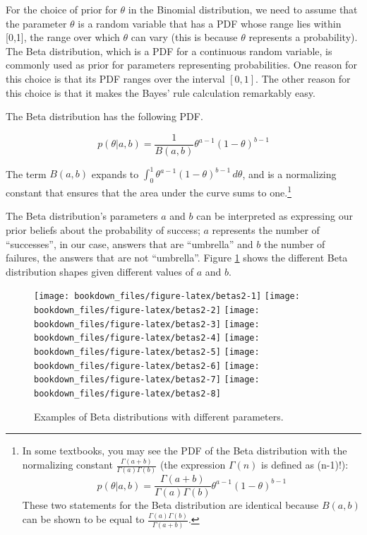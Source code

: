 \documentclass[12pt,]{krantz}
\theoremstyle{definition}
\theoremstyle{definition}
\theoremstyle{definition}
\theoremstyle{remark}
\begin{document}
For the choice of prior for \(\theta\) in the Binomial distribution, we need to assume that the parameter \(\theta\) is a random variable that has a PDF whose range lies within {[}0,1{]}, the range over which \(\theta\) can vary (this is because \(\theta\) represents a probability). The Beta distribution, which is a PDF for a continuous random variable, is commonly used as prior for parameters representing probabilities. One reason for this choice is that its PDF ranges over the interval \([0,1]\). The other reason for this choice is that it makes the Bayes' rule calculation remarkably easy.

The Beta distribution has the following PDF.

\begin{equation}
p(\theta|a,b)=  \frac{1}{B(a,b)} \theta^{a - 1} (1-\theta)^{b-1}   
\label{eq:beta}
\end{equation}

The term \(B(a,b)\) expands to \(\int_0^1 \theta^{a-1}(1-\theta)^{b-1}\, d\theta\), and is a normalizing constant that ensures that the area under the curve sums to one.\footnote{In some textbooks, you may see the PDF of the Beta distribution with the normalizing constant \(\frac{\Gamma(a+b)}{\Gamma(a)\Gamma(b)}\) (the expression \(\Gamma(n)\) is defined as (n-1)!): \[p(\theta|a,b)=  \frac{\Gamma(a+b)}{\Gamma(a)\Gamma(b)} \theta^{a - 1} (1-\theta)^{b-1}\] These two statements for the Beta distribution are identical because \(B(a,b)\) can be shown to be equal to \(\frac{\Gamma(a)\Gamma(b)}{\Gamma(a+b)}\).}

The Beta distribution's parameters \(a\) and \(b\) can be interpreted as expressing our prior beliefs about the probability of success; \(a\) represents the number of ``successes'', in our case, answers that are ``umbrella'' and \(b\) the number of failures, the answers that are not ``umbrella''. Figure \ref{fig:betas2} shows the different Beta distribution shapes given different values of \(a\) and \(b\).

\begin{figure}
\texttt{[image: bookdown\_files/figure-latex/betas2-1]} \texttt{[image: bookdown\_files/figure-latex/betas2-2]} \texttt{[image: bookdown\_files/figure-latex/betas2-3]} \texttt{[image: bookdown\_files/figure-latex/betas2-4]} \texttt{[image: bookdown\_files/figure-latex/betas2-5]} \texttt{[image: bookdown\_files/figure-latex/betas2-6]} \texttt{[image: bookdown\_files/figure-latex/betas2-7]} \texttt{[image: bookdown\_files/figure-latex/betas2-8]} \caption{Examples of Beta distributions with different parameters.}\label{fig:betas2}
\end{figure}
\end{document}
